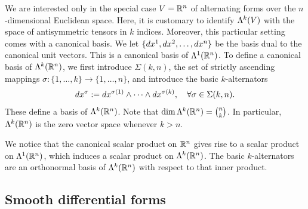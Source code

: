 \documentclass[10pt,letterpaper]{article}
\newcommand\cye[1]{%
  \protect\leavevmode
  \begingroup
    \color{red!35!yellow}%
    #1%
  \endgroup
}
\begin{document}
We are interested only in the special case $V = {\mathbb R}^{n}$ of alternating forms over the $n$-dimensional Euclidean space. 
Here, it is customary to identify $\Lambda^{k}(V)$ with the space of antisymmetric tensors in $k$ indices. 
Moreover, this particular setting comes with a canonical basis. 
We let \(\{dx^1, dx^2, \ldots, dx^{n}\}\) be the basis dual to the canonical unit vectors.
This is a canonical basis of $\Lambda^{1}({\mathbb R}^{n})$. 
To define a canonical basis of $\Lambda^{k}({\mathbb R}^{n})$, 
we first introduce $\Sigma(k,n)$, the set of strictly ascending mappings $\sigma : \{1,\dots,k\} \rightarrow \{1,\dots,n\}$,
and introduce the basic $k$-alternators 
\begin{align*}
    dx^{\sigma} := dx^{\sigma(1)} \wedge \dots \wedge dx^{\sigma(k)}, 
    \quad 
    \forall \sigma \in \Sigma(k,n). 
\end{align*}
These define a basis of $\Lambda^{k}({\mathbb R}^{n})$.
Note that 
$\dim \Lambda^{k}({\mathbb R}^{n}) = \binom{n}{k}$. 
In particular, $\Lambda^{k}({\mathbb R}^{n})$ is the zero vector space whenever $k > n$.

We notice that the canonical scalar product on ${\mathbb R}^{n}$ gives rise to a scalar product on $\Lambda^{1}({\mathbb R}^{n})$,
which induces a scalar product on $\Lambda^{k}({\mathbb R}^{n})$.
The basic $k$-alternators are an orthonormal basis of $\Lambda^{k}({\mathbb R}^{n})$ with respect to that inner product. 

\subsection{\cye{Smooth differential forms}}
\end{document}
